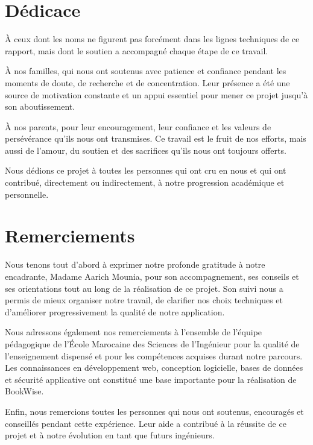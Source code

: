 \documentclass[12pt,a4paper]{report}
\begin{document}
\setcounter{page}{1}

\chapter*{Dédicace}

À ceux dont les noms ne figurent pas forcément dans les lignes techniques de ce rapport, mais dont le soutien a accompagné chaque étape de ce travail.

À nos familles, qui nous ont soutenus avec patience et confiance pendant les moments de doute, de recherche et de concentration. Leur présence a été une source de motivation constante et un appui essentiel pour mener ce projet jusqu'à son aboutissement.

À nos parents, pour leur encouragement, leur confiance et les valeurs de persévérance qu'ils nous ont transmises. Ce travail est le fruit de nos efforts, mais aussi de l'amour, du soutien et des sacrifices qu'ils nous ont toujours offerts.

Nous dédions ce projet à toutes les personnes qui ont cru en nous et qui ont contribué, directement ou indirectement, à notre progression académique et personnelle.

\chapter*{Remerciements}

Nous tenons tout d'abord à exprimer notre profonde gratitude à notre encadrante, Madame Aarich Mounia, pour son accompagnement, ses conseils et ses orientations tout au long de la réalisation de ce projet. Son suivi nous a permis de mieux organiser notre travail, de clarifier nos choix techniques et d'améliorer progressivement la qualité de notre application.

Nous adressons également nos remerciements à l'ensemble de l'équipe pédagogique de l'École Marocaine des Sciences de l'Ingénieur pour la qualité de l'enseignement dispensé et pour les compétences acquises durant notre parcours. Les connaissances en développement web, conception logicielle, bases de données et sécurité applicative ont constitué une base importante pour la réalisation de BookWise.

Enfin, nous remercions toutes les personnes qui nous ont soutenus, encouragés et conseillés pendant cette expérience. Leur aide a contribué à la réussite de ce projet et à notre évolution en tant que futurs ingénieurs.
\end{document}

